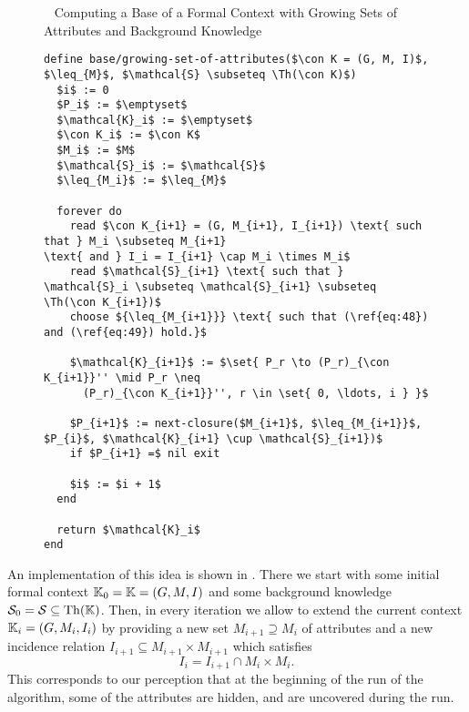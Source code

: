 
\begin{figure}[tp]
  \begin{Algorithm}~ Computing a Base of a Formal
    Context with Growing Sets of Attributes and Background Knowledge%
    \label{alg:base/growing-set-of-attributes}
\begin{lstlisting}
define base/growing-set-of-attributes($\con K = (G, M, I)$, $\leq_{M}$, $\mathcal{S} \subseteq \Th(\con K)$)
  $i$ := 0
  $P_i$ := $\emptyset$
  $\mathcal{K}_i$ := $\emptyset$
  $\con K_i$ := $\con K$
  $M_i$ := $M$
  $\mathcal{S}_i$ := $\mathcal{S}$
  $\leq_{M_i}$ := $\leq_{M}$

  forever do
    read $\con K_{i+1} = (G, M_{i+1}, I_{i+1}) \text{ such that } M_i \subseteq M_{i+1}
\text{ and } I_i = I_{i+1} \cap M_i \times M_i$
    read $\mathcal{S}_{i+1} \text{ such that } \mathcal{S}_i \subseteq \mathcal{S}_{i+1} \subseteq \Th(\con K_{i+1})$
    choose ${\leq_{M_{i+1}}} \text{ such that (\ref{eq:48}) and (\ref{eq:49}) hold.}$

    $\mathcal{K}_{i+1}$ := $\set{ P_r \to (P_r)_{\con K_{i+1}}'' \mid P_r \neq
      (P_r)_{\con K_{i+1}}'', r \in \set{ 0, \ldots, i } }$

    $P_{i+1}$ := next-closure($M_{i+1}$, $\leq_{M_{i+1}}$, $P_{i}$, $\mathcal{K}_{i+1} \cup \mathcal{S}_{i+1})$
    if $P_{i+1} =$ nil exit

    $i$ := $i + 1$  
  end

  return $\mathcal{K}_i$  
end    
\end{lstlisting}  
  \end{Algorithm}
\end{figure}

An implementation of this idea is shown in .
There we start with some initial formal context ${\mathbb{K}}_{0} = {\mathbb{K}} = (G, M, I)$ and some
background knowledge $\mathcal{S}_{0} = \mathcal{S} \subseteq \operatorname{Th}({\mathbb{K}})$.  Then, in
every iteration we allow to extend the current context ${\mathbb{K}}_{i} = (G, M_{i}, I_{i})$ by
providing a new set $M_{i+1} \supseteq M_{i}$ of attributes and a new incidence relation
$I_{i+1} \subseteq M_{i+1} \times M_{i+1}$ which satisfies
\begin{equation*}
  I_{i} = I_{i+1} \cap M_{i} \times M_{i}.
\end{equation*}
This corresponds to our perception that at the beginning of the run of the algorithm, some
of the attributes are hidden, and are uncovered during the run.

